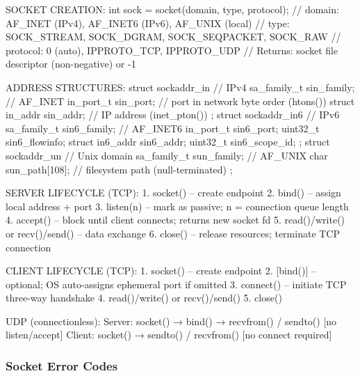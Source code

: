 \documentclass[11pt,letterpaper]{article}
\begin{document}
\begin{codebox}
SOCKET CREATION:
  int sock = socket(domain, type, protocol);
  // domain:   AF_INET (IPv4), AF_INET6 (IPv6), AF_UNIX (local)
  // type:     SOCK_STREAM, SOCK_DGRAM, SOCK_SEQPACKET, SOCK_RAW
  // protocol: 0 (auto), IPPROTO_TCP, IPPROTO_UDP
  // Returns: socket file descriptor (non-negative) or -1

ADDRESS STRUCTURES:
  struct sockaddr_in {          // IPv4
    sa_family_t sin_family;     // AF_INET
    in_port_t   sin_port;       // port in network byte order (htons())
    struct in_addr sin_addr;    // IP address (inet_pton())
  };
  struct sockaddr_in6 {         // IPv6
    sa_family_t sin6_family;    // AF_INET6
    in_port_t   sin6_port;
    uint32_t    sin6_flowinfo;
    struct in6_addr sin6_addr;
    uint32_t    sin6_scope_id;
  };
  struct sockaddr_un {          // Unix domain
    sa_family_t sun_family;     // AF_UNIX
    char        sun_path[108];  // filesystem path (null-terminated)
  };

SERVER LIFECYCLE (TCP):
  1. socket()   -- create endpoint
  2. bind()     -- assign local address + port
  3. listen(n)  -- mark as passive; n = connection queue length
  4. accept()   -- block until client connects; returns new socket fd
  5. read()/write() or recv()/send()  -- data exchange
  6. close()    -- release resources; terminate TCP connection

CLIENT LIFECYCLE (TCP):
  1. socket()   -- create endpoint
  2. [bind()]   -- optional; OS auto-assigns ephemeral port if omitted
  3. connect()  -- initiate TCP three-way handshake
  4. read()/write() or recv()/send()
  5. close()

UDP (connectionless):
  Server: socket() → bind() → recvfrom() / sendto() [no listen/accept]
  Client: socket() → sendto() / recvfrom() [no connect required]
\end{codebox}

\subsubsection{Socket Error Codes}
\end{document}
